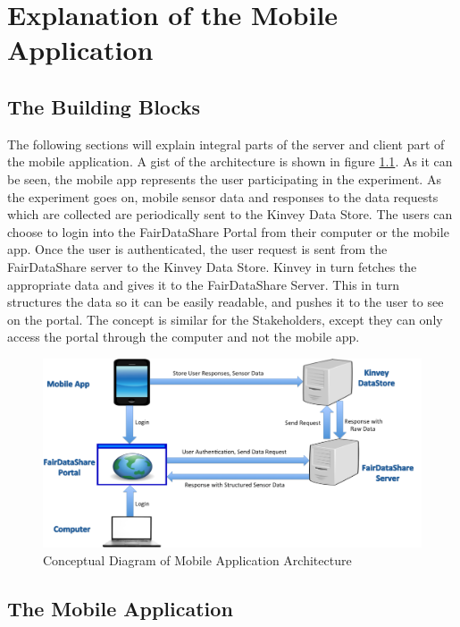 \chapter{Explanation of the Mobile Application}

\section{The Building Blocks}

The following sections will explain integral parts of the server and client part of the mobile application. A gist of the architecture is shown
in figure \ref{fig:bb}. As it can be seen, the mobile app represents the user participating in the experiment. As the experiment goes on,
mobile sensor data and responses to the data requests which are collected are periodically sent to the Kinvey Data Store. 
The users can choose to login into the FairDataShare Portal from their computer or the mobile app. Once the user is authenticated, the user request
is sent from the FairDataShare server to the Kinvey Data Store. Kinvey in turn fetches the appropriate data and gives it to the FairDataShare Server. This in turn structures the data so it can be easily readable, and pushes it to the user to see on the portal. The concept is similar for the Stakeholders, except they can only access the portal through the computer and not the mobile app.

\begin{figure}[ht!]
\centering
\includegraphics[width=\textwidth,keepaspectratio]{./images/blocks_app}
\caption{Conceptual Diagram of Mobile Application Architecture}
\label{fig:bb}
\end{figure}

\section{The Mobile Application}

